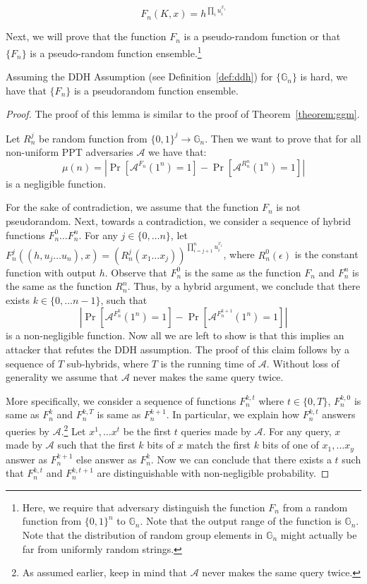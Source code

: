 \[F_n(K,x) = h^{\prod_{i} u_i^{x_i}}\]

Next, we will prove that the function $F_n$ is a pseudo-random function or that $\{F_n\}$ is a pseudo-random function ensemble.\footnote{Here, we require that adversary distinguish the function $F_n$ from a random function from $\{0,1\}^n$ to $\mathbb{G}_n$. Note that the output range of the function is $\mathbb{G}_n$. Note that the distribution of random group elements in $\mathbb{G}_n$ might actually be far from uniformly random strings.}
\begin{lemma}
    Assuming the DDH Assumption (see Definition~\ref{def:ddh}) for $\{\mathbb{G}_n\}$ is hard, we have that $\{F_n\}$ is a pseudorandom function ensemble.
\end{lemma}
\begin{proof}
    The proof of this lemma is similar to the proof of Theorem~\ref{theorem:ggm}.

    Let $R_n^j$ be random function from $\{0,1\}^j \rightarrow \mathbb{G}_n$. Then we want to prove that for all non-uniform PPT adversaries $\mathcal{A}$ we have that:
    \[\mu(n) = \left|\Pr[\mathcal{A}^{F_n}(1^n) =1] -  \Pr[\mathcal{A}^{R_n^n}(1^n) =1]\right|\]
    is a negligible function.

    For the sake of contradiction, we assume that the function $F_n$ is not pseudorandom. Next, towards a contradiction, we consider a sequence of hybrid functions $F_n^0 \ldots F_n^n$.
    For any $j \in \{0,\ldots n\}$, let $F^j_n((h,u_{j}\ldots u_n),x) = (R_n^j(x_1\ldots x_j))^{\prod_{i=j+1}^n u_i^{x_i}}$, where $R_n^0(\epsilon)$ is the constant function with output $h$. Observe that $F_n^0$ is the same as the function $F_n$ and $F_n^n$ is the same as the function $R_n^n$. Thus, by a hybrid argument, we conclude that there exists $k \in \{0,\ldots n-1\}$, such that
    \[\left|\Pr[\mathcal{A}^{F_n^k}(1^n) =1] -  \Pr[\mathcal{A}^{F_n^{k+1}}(1^n) =1]\right|\]
    is a non-negligible function. Now all we are left to show is that this implies an attacker that refutes the DDH assumption. The proof of this claim follows by a sequence of $T$ sub-hybrids, where $T$ is the running time of $\mathcal{A}$. Without loss of generality we assume that $\mathcal{A}$ never makes the same query twice.

    More specifically, we consider a sequence of functions $F_n^{k,t}$ where $t \in \{0,T\}$, $F_n^{k,0}$ is same as $F_n^{k}$ and $F_n^{k,T}$ is same as $F_n^{k+1}$. In particular, we explain how $F_n^{k,t}$ answers queries by $\mathcal{A}$.\footnote{As assumed earlier, keep in mind that $\mathcal{A}$ never makes the same query twice.} Let $x^1, \ldots x^t$ be the first $t$ queries made by $\mathcal{A}$. For any query, $x$ made by $\mathcal{A}$ such that the first $k$ bits of $x$ match the first $k$ bits of one of $x_1, \ldots x_y$ answer as $F_n^{k+1}$ else answer as $F_n^{k}$. Now we can conclude that there exists a $t$ such that $F_n^{k,t}$ and $F_n^{k,t+1}$ are distinguishable with non-negligible probability.


\end{proof}

